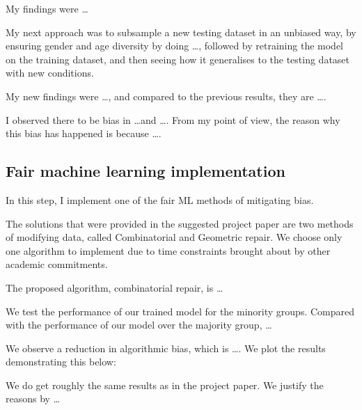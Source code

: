 \documentclass[conference]{IEEEtran}
\begin{document}
My findings were \dots

My next approach was to subsample a new testing dataset in an unbiased way, by ensuring gender and age diversity by doing \dots, followed by retraining the model on the training dataset, and then seeing how it generalises to the testing dataset with new conditions.

My new findings were \dots, and compared to the previous results, they are \dots.

I observed there to be bias in \dots and \dots. From my point of view, the reason why this bias has happened is because \dots.

\subsection{Fair machine learning implementation}
In this step, I implement one of the fair ML methods of mitigating bias. 

The solutions that were provided in the suggested project paper \cite{Feldman2015ComputationalFP} are two methods of modifying data, called Combinatorial and Geometric repair. We choose only one algorithm to implement due to time constraints brought about by other academic commitments. 

The proposed algorithm, combinatorial repair, is \dots

We test the performance of our trained model for the minority groups. Compared with the performance of our model over the majority group, \dots

We observe a reduction in algorithmic bias, which is \dots. We plot the results demonstrating this below:

We do get roughly the same results as in the project paper. We justify the reasons by \dots



\end{document}
